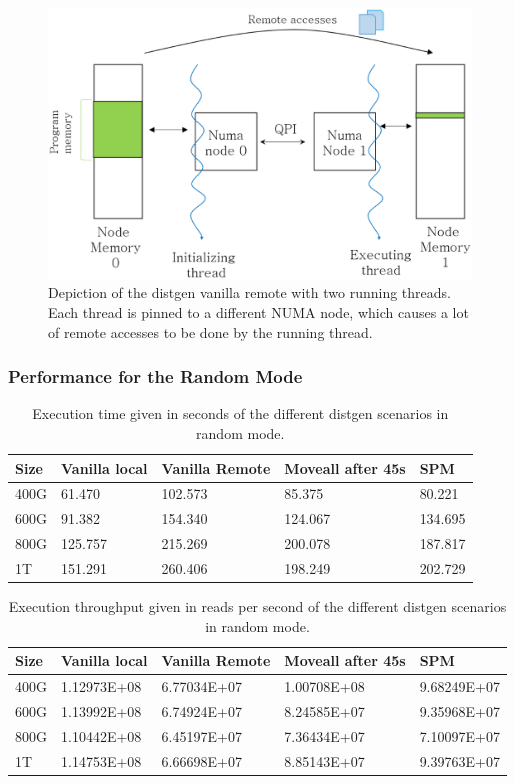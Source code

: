 \begin{figure}
	\centering
		\includegraphics[width=.7\textwidth]{figures/distgentt-remote.eps}
		\caption[Depiction of the working of the distgen vanilla remote scenario with two threads]{Depiction of the distgen vanilla remote with two running threads. Each thread is pinned to a different NUMA node, which causes a lot of remote accesses to be done by the running thread.}
		\label{fig:dgentt-remote}
\end{figure}
\FloatBarrier
\subsubsection{Performance for the Random Mode}\label{subsection:res-dgrandom-2t-scens}

\begin{table}
	\centering
		\begin{tabularx}{\textwidth}{|l|l|l|l|X|}
		\hline
			Size & Vanilla local & Vanilla Remote & Moveall after 45s & SPM \\
			\hline
			400G & 61.470 & 102.573 & 85.375 & 80.221\\
			\hline
			600G & 91.382 & 154.340 & 124.067 & 134.695\\
			\hline
			800G & 125.757 & 215.269 & 200.078 & 187.817\\
			\hline
			1T & 151.291 & 260.406 & 198.249 & 202.729\\
			\hline
		\end{tabularx}
		\caption{Execution time given in seconds of the different distgen scenarios in random mode.}
		\label{table:res-dgentimrdm2t}
\end{table}

\begin{table}
	\centering
		\begin{tabularx}{\textwidth}{|l|l|l|l|X|}
		\hline
			Size & Vanilla local & Vanilla Remote & Moveall after 45s & SPM \\
			\hline
			400G & 1.12973E+08 & 6.77034E+07 & 1.00708E+08 & 9.68249E+07\\
			\hline
			600G & 1.13992E+08 & 6.74924E+07 & 8.24585E+07 & 9.35968E+07\\
			\hline
			800G & 1.10442E+08 & 6.45197E+07 & 7.36434E+07 & 7.10097E+07\\
			\hline
			1T & 1.14753E+08 & 6.66698E+07 & 8.85143E+07 & 9.39763E+07\\
			\hline
		\end{tabularx}
		\caption{Execution throughput given in reads per second of the different distgen scenarios in random mode.}
		\label{table:res-dgentrgrdm2t}
\end{table}

